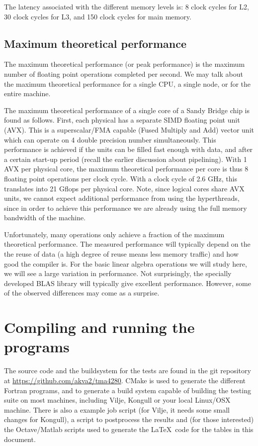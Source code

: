 The latency associated with the different memory levels is: 8 clock cycles for
L2, 30 clock cycles for L3, and 150 clock cycles for main memory.

\subsection{Maximum theoretical performance}

The maximum theoretical performance (or peak performance) is the maximum number
of floating point operations completed per second. We may talk about the maximum
theoretical performance for a single CPU, a single node, or for the entire
machine.

The maximum theoretical performance of a single core of a Sandy Bridge chip is
found as follows. First, each physical has a separate SIMD floating point unit
(AVX). This is a superscalar/FMA capable (Fused Multiply and Add) vector unit
which can operate on 4 double precision number simultaneously. This performance
is achieved if the units can be filled fast enough with data, and after a
certain start-up period (recall the earlier discussion about pipelining). With 1
AVX per physical core, the maximum theoretical performance per core is thus 8
floating point operations per clock cycle. With a clock cycle of 2.6 GHz, this
translates into 21 Gflops per physical core. Note, since logical cores share AVX
units, we cannot expect additional performance from using the hyperthreads,
since in order to achieve this performance we are already using the full memory
bandwidth of the machine.

Unfortunately, many operations only achieve a fraction of the maximum
theoretical performance. The measured performance will typically depend on the
the reuse of data (a high degree of reuse means less memory traffic) and how
good the compiler is. For the basic linear algebra operations we will study
here, we will see a large variation in performance. Not surprisingly, the
specially developed BLAS library will typically give excellent performance.
However, some of the observed differences may come as a surprise.

\section{Compiling and running the programs}

The source code and the buildsystem for the tests are found in the git
repository at \url{https://github.com/akva2/tma4280}. CMake is used to generate
the different Fortran programs, and to generate a build system capable of
building the testing suite on most machines, including Vilje, Kongull or your
local Linux/OSX machine. There is also a example job script (for Vilje, it needs
some small changes for Kongull), a script to postprocess the results and (for
those interested) the Octave/Matlab scripts used to generate the \LaTeX~code
for the tables in this document.

